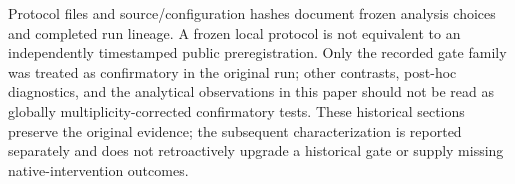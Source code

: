 Protocol files and source/configuration hashes document frozen analysis choices and completed run lineage. A frozen local protocol is not equivalent to an independently timestamped public preregistration. Only the recorded gate family was treated as confirmatory in the original run; other contrasts, post-hoc diagnostics, and the analytical observations in this paper should not be read as globally multiplicity-corrected confirmatory tests. These historical sections preserve the original evidence; the subsequent characterization is reported separately and does not retroactively upgrade a historical gate or supply missing native-intervention outcomes.
